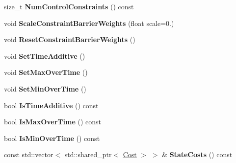 \begin{DoxyCompactItemize}
\item 
size\+\_\+t {\bfseries Num\+Control\+Constraints} () const \hypertarget{classilqgames_1_1_player_cost_a61ab18fcd64b4fb99014ef14178f61d1}{}\label{classilqgames_1_1_player_cost_a61ab18fcd64b4fb99014ef14178f61d1}

\item 
void {\bfseries Scale\+Constraint\+Barrier\+Weights} (float scale=0.)\hypertarget{classilqgames_1_1_player_cost_a01099622def541cf226c94140c38d485}{}\label{classilqgames_1_1_player_cost_a01099622def541cf226c94140c38d485}

\item 
void {\bfseries Reset\+Constraint\+Barrier\+Weights} ()\hypertarget{classilqgames_1_1_player_cost_add7445e01947fcaaf9d5f1e392471970}{}\label{classilqgames_1_1_player_cost_add7445e01947fcaaf9d5f1e392471970}

\item 
void {\bfseries Set\+Time\+Additive} ()\hypertarget{classilqgames_1_1_player_cost_aabdacf36b0f3bc01b96ea1b62da9737a}{}\label{classilqgames_1_1_player_cost_aabdacf36b0f3bc01b96ea1b62da9737a}

\item 
void {\bfseries Set\+Max\+Over\+Time} ()\hypertarget{classilqgames_1_1_player_cost_ab348e49baf8f7e580914a17ce79f175e}{}\label{classilqgames_1_1_player_cost_ab348e49baf8f7e580914a17ce79f175e}

\item 
void {\bfseries Set\+Min\+Over\+Time} ()\hypertarget{classilqgames_1_1_player_cost_a00b0e84c89dfef9375d3ee17c9b8e4ef}{}\label{classilqgames_1_1_player_cost_a00b0e84c89dfef9375d3ee17c9b8e4ef}

\item 
bool {\bfseries Is\+Time\+Additive} () const \hypertarget{classilqgames_1_1_player_cost_a0a7a783fc2d25d16b20d8ecb232de147}{}\label{classilqgames_1_1_player_cost_a0a7a783fc2d25d16b20d8ecb232de147}

\item 
bool {\bfseries Is\+Max\+Over\+Time} () const \hypertarget{classilqgames_1_1_player_cost_a1a07ef47dadd7821b19357062d74ab79}{}\label{classilqgames_1_1_player_cost_a1a07ef47dadd7821b19357062d74ab79}

\item 
bool {\bfseries Is\+Min\+Over\+Time} () const \hypertarget{classilqgames_1_1_player_cost_aff2f1b2d48982fa767c8cd9ad770710f}{}\label{classilqgames_1_1_player_cost_aff2f1b2d48982fa767c8cd9ad770710f}

\item 
const std\+::vector$<$ std\+::shared\+\_\+ptr$<$ \hyperlink{classilqgames_1_1_cost}{Cost} $>$ $>$ \& {\bfseries State\+Costs} () const \hypertarget{classilqgames_1_1_player_cost_adfb1861f05ba2efa163e7a28670f0585}{}\label{classilqgames_1_1_player_cost_adfb1861f05ba2efa163e7a28670f0585}


\end{DoxyCompactItemize}
